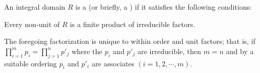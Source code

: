 An integral domain $R$ is a  (or briefly, a ) if it satisfies the following conditions:

 Every non-unit of $R$ is a finite product of irreducible factors.

 The foregoing factorization is unique to within order and unit factors; that is, if $\prod_{i=1}^{m} p_i = \prod_{j=1}^{n} p'_j$ where the $p_i$ and $p'_j$ are irreducible, then $m = n$ and by a suitable ordering $p_i$ and $p'_i$ are associates $(i = 1, 2, \cdots, m)$.
